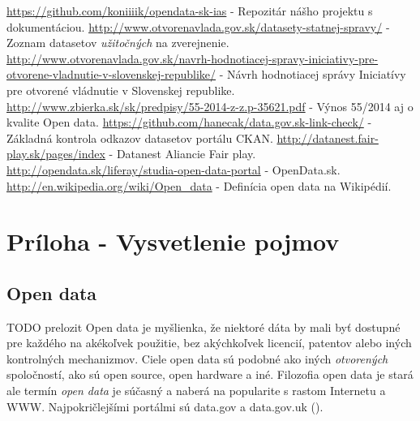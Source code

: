 \documentclass[12pt,a4paper]{article}
\begin{document}
\renewcommand{\refname}{Literatúra}
{}
\begin{thebibliography}{99}
   \url{https://github.com/koniiiik/opendata-sk-ias} - Repozitár nášho projektu s dokumentáciou. %
   \url{http://www.otvorenavlada.gov.sk/datasety-statnej-spravy/} - Zoznam datasetov \emph{užitočných} na zverejnenie.
   \url{http://www.otvorenavlada.gov.sk/navrh-hodnotiacej-spravy-iniciativy-pre-otvorene-vladnutie-v-slovenskej-republike/} - Návrh hodnotiacej správy Iniciatívy pre otvorené vládnutie v Slovenskej republike.
   \url{http://www.zbierka.sk/sk/predpisy/55-2014-z-z.p-35621.pdf} - Výnos 55/2014 aj o kvalite Open data. 
   \url{https://github.com/hanecak/data.gov.sk-link-check/} - Základná kontrola odkazov datasetov portálu CKAN. 
   \url{http://datanest.fair-play.sk/pages/index} - Datanest Aliancie Fair play. 
   \url{http://opendata.sk/liferay/studia-open-data-portal} - OpenData.sk. 
   \url{http://en.wikipedia.org/wiki/Open_data} - Definícia open data na Wikipédií. 
\end{thebibliography}


\section*{Príloha - Vysvetlenie pojmov} 
\subsection*{Open data} 
\label{opendata} 
TODO prelozit 
Open data je myšlienka, že niektoré dáta by mali byť dostupné pre každého na akékoľvek použitie, bez akýchkoľvek licencií, patentov alebo iných kontrolných mechanizmov. Ciele open data sú podobné ako iných \emph{otvorených} spoločností, ako sú open source, open hardware a iné. Filozofia open data je stará ale termín \emph{open data} je súčasný a naberá na popularite s rastom Internetu a WWW. Najpokričlejšími portálmi sú data.gov a data.gov.uk (\cite{opendata-wiki}). 
\end{document}
